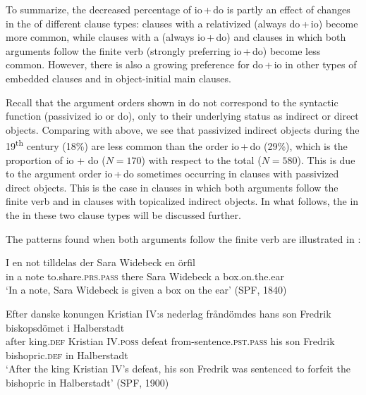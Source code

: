 \documentclass[output=paper]{langscibook}
\begin{document}
To summarize, the decreased percentage of io\,+\,do is partly an effect of changes in the  of different clause types: clauses with a relativized  (always do\,+\,io) become more common, while clauses with a  (always io\,+\,do) and clauses in which both arguments follow the finite verb (strongly preferring io\,+\,do) become less common. However, there is also a growing preference for do\,+\,io in other types of embedded clauses and in object-initial main clauses.



Recall that the argument orders shown in  do not correspond to the syntactic function (passivized io or do), only to their underlying status as indirect or direct objects. Comparing with  above, we see that passivized indirect objects during the 19\textsuperscript{th} century (18\%) are less common than the order io\,+\,do (29\%), which is the proportion of  io + do ($N=170$) with respect to the total ($N=580$). This is due to the argument order io\,+\,do sometimes occurring in clauses with passivized direct objects. This is the case in clauses in which both arguments follow the finite verb and in clauses with topicalized indirect objects. In what follows, the  in the  in these two clause types will be discussed further.



The patterns found when both arguments follow the finite verb are illustrated in :


\ea%
    \label{ex:falk:20}
\ea\label{ex:falk:20a}
\gll I  en  not  tilldelas            der  Sara  Widebeck  en  örfil\\
      in  a  note  to.share\textsc{.prs}.\textsc{pass}    there  Sara  Widebeck  a  box.on.the.ear\\
\glt ‘In a note, Sara Widebeck is given a box on the ear’ (SPF, 1840)

\ex\label{ex:falk:20b}
\gll Efter  danske  konungen  Kristian IV:s    nederlag  fråndömdes      hans  son  Fredrik  biskopsdömet  i  Halberstadt\\
after    king.\textsc{def}    Kristian IV.\textsc{poss}  defeat      from-sentence.\textsc{pst}.\textsc{pass}      his   son  Fredrik  bishopric.\textsc{def}  in  Halberstadt\\
\glt ‘After the  king Kristian IV’s defeat, his son Fredrik was sentenced to forfeit the bishopric in Halberstadt’ (SPF, 1900)
\end{document}
